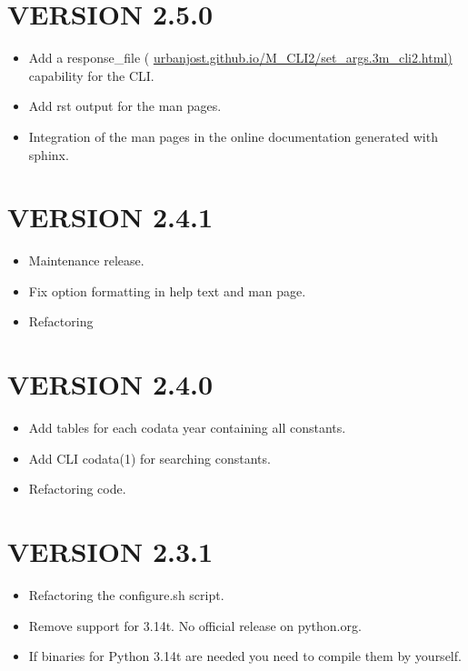 \section*{VERSION 2.5.0}
\begin{itemize}
\item Add a response\_file ( \href{https://urbanjost.github.io/M\_CLI2/set\_args.3m\_cli2.html}{urbanjost.github.io/M\_CLI2/set\_args.3m\_cli2.html)}  
      capability for the CLI.
\item Add rst output for the man pages.
\item Integration of the man pages in the online documentation generated with sphinx.
\end{itemize}



\section*{VERSION 2.4.1}
\begin{itemize}
\item Maintenance release.
\item Fix option formatting in help text and man page.
\item Refactoring
\end{itemize}



\section*{VERSION 2.4.0}
\begin{itemize}
\item Add tables for each codata year containing all constants.
\item Add CLI codata(1) for searching constants.
\item Refactoring code.
\end{itemize}



\section*{VERSION 2.3.1}
\begin{itemize}
\item Refactoring the configure.sh script.
\item Remove support for 3.14t. No official release on python.org.
\item If binaries for Python 3.14t are needed you need to compile them by
yourself.
\end{itemize}



